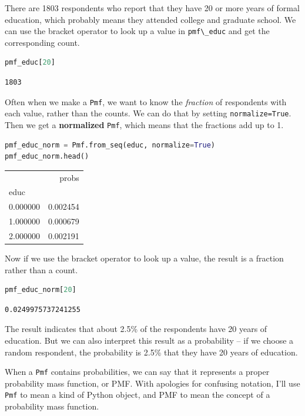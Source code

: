 \documentclass[
]{book}
\newcommand{\passthrough}[1]{#1}
\begin{document}
There are 1803 respondents who report that they have 20 or more years of
formal education, which probably means they attended college and
graduate school. We can use the bracket operator to look up a value in
\passthrough{\lstinline!pmf\_educ!} and get the corresponding count.

\begin{lstlisting}[language=Python]
pmf_educ[20]
\end{lstlisting}

\begin{lstlisting}
1803
\end{lstlisting}

Often when we make a \passthrough{\lstinline!Pmf!}, we want to know the
\emph{fraction} of respondents with each value, rather than the counts.
We can do that by setting \passthrough{\lstinline!normalize=True!}. Then
we get a \textbf{normalized} \passthrough{\lstinline!Pmf!}, which means
that the fractions add up to 1.

\begin{lstlisting}[language=Python]
pmf_educ_norm = Pmf.from_seq(educ, normalize=True)
pmf_educ_norm.head()
\end{lstlisting}

\begin{tabular}{lr}
\toprule
 & probs \\
educ &  \\
\midrule
0.000000 & 0.002454 \\
1.000000 & 0.000679 \\
2.000000 & 0.002191 \\
\bottomrule
\end{tabular}

Now if we use the bracket operator to look up a value, the result is a
fraction rather than a count.

\begin{lstlisting}[language=Python]
pmf_educ_norm[20]
\end{lstlisting}

\begin{lstlisting}
0.0249975737241255
\end{lstlisting}

The result indicates that about 2.5\% of the respondents have 20 years
of education. But we can also interpret this result as a probability --
if we choose a random respondent, the probability is 2.5\% that they
have 20 years of education.

When a \passthrough{\lstinline!Pmf!} contains probabilities, we can say
that it represents a proper probability mass function, or PMF. With
apologies for confusing notation, I'll use \passthrough{\lstinline!Pmf!}
to mean a kind of Python object, and PMF to mean the concept of a
probability mass function.
\end{document}
